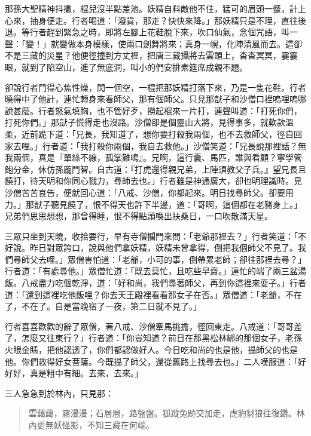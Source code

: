 那孫大聖精神抖擻，棍兒沒半點差池。妖精自料敵他不住，猛可的眉頭一蹙，計上心來，抽身便走。行者喝道：「潑貨，那走？快快來降。」那妖精只是不理，直往後退。等行者趕到緊急之時，即將左腳上花鞋脫下來，吹口仙氣，念個咒語，叫一聲：「變！」就變做本身模樣，使兩口劍舞將來；真身一幌，化陣清風而去。這卻不是三藏的災星？他便徑撞到方丈裡，把唐三藏攝將去雲頭上，杳杳冥冥，霎霎眼，就到了陷空山，進了無底洞，叫小的們安排素筵席成親不題。

卻說行者鬥得心焦性燥，閃一個空，一棍把那妖精打落下來，乃是一隻花鞋。行者曉得中了他計，連忙轉身來看師父，那有個師父。只見那獃子和沙僧口裡嗚哩嗚哪說甚麼。行者怒氣填胸，也不管好歹，撈起棍來一片打，連聲叫道：「打死你們，打死你們。」那獃子慌得走也沒路。沙僧卻是個靈山大將，見得事多，就軟款溫柔，近前跪下道：「兄長，我知道了，想你要打殺我兩個，也不去救師父，徑自回家去哩。」行者道：「我打殺你兩個，我自去救他。」沙僧笑道：「兄長說那裡話？無我兩個，真是『單絲不線，孤掌難鳴』。兄啊，這行囊、馬匹，誰與看顧？寧學管鮑分金，休仿孫龐鬥智。自古道：『打虎還得親兄弟，上陣須教父子兵。』望兄長且饒打，待天明和你同心戮力，尋師去也。」行者雖是神通廣大，卻也明理識時。見沙僧苦苦哀告，便就回心道：「八戒、沙僧，你都起來。明日找尋師父。卻要用力。」那獃子聽見饒了，恨不得天也許下半邊，道：「哥啊，這個都在老豬身上。」兄弟們思思想想，那曾得睡，恨不得點頭喚出扶桑日，一口吹散滿天星。

三眾只坐到天曉，收拾要行，早有寺僧攔門來問：「老爺那裡去？」行者笑道：「不好說。昨日對眾誇口，說與他們拿妖精，妖精未曾拿得，倒把我個師父不見了。我們尋師父去哩。」眾僧害怕道：「老爺，小可的事，倒帶累老師；卻往那裡去尋？」行者道：「有處尋他。」眾僧忙道：「既去莫忙，且吃些早齋。」連忙的端了兩三盆湯飯。八戒盡力吃個乾淨，道：「好和尚，我們尋著師父，再到你這裡來耍子。」行者道：「還到這裡吃他飯哩？你去天王殿裡看看那女子在否。」眾僧道：「老爺，不在了，不在了。自是當晚宿了一夜，第二日就不見了。」

行者喜喜歡歡的辭了眾僧，著八戒、沙僧牽馬挑擔，徑回東走。八戒道：「哥哥差了，怎麼又往東行？」行者道：「你豈知道？前日在那黑松林綁的那個女子，老孫火眼金睛，把他認透了，你們都認做好人。今日吃和尚的也是他，攝師父的也是他。你們救得好女菩薩。今既攝了師父，還從舊路上找尋去也。」二人嘆服道：「好好好，真是粗中有細。去來，去來。」

三人急急到於林內，只見那：
\begin{quote}
雲藹藹，霧漫漫；石層層，路盤盤。狐蹤兔跡交加走，虎豹豺狼往復鑽。林內更無妖怪影，不知三藏在何端。
\end{quote}

